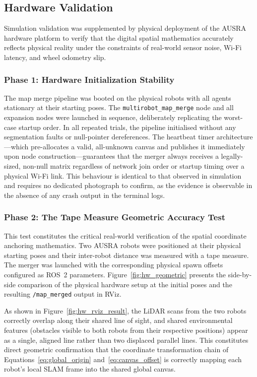 \documentclass{article}
\begin{document}
\subsection{Hardware Validation}
\label{subsec:map_merge_hw_validation}

Simulation validation was supplemented by physical deployment of the AUSRA hardware platform to verify that the digital spatial mathematics accurately reflects physical reality under the constraints of real-world sensor noise, Wi-Fi latency, and wheel odometry slip.

\subsubsection{Phase 1: Hardware Initialization Stability}

The map merge pipeline was booted on the physical robots with all agents stationary at their starting poses. The \texttt{multirobot\_map\_merge} node and all expansion nodes were launched in sequence, deliberately replicating the worst-case startup order. In all repeated trials, the pipeline initialised without any segmentation faults or null-pointer dereferences. The heartbeat timer architecture—which pre-allocates a valid, all-unknown canvas and publishes it immediately upon node construction—guarantees that the merger always receives a legally-sized, non-null matrix regardless of network join order or startup timing over a physical Wi-Fi link. This behaviour is identical to that observed in simulation and requires no dedicated photograph to confirm, as the evidence is observable in the absence of any crash output in the terminal logs.

\subsubsection{Phase 2: The Tape Measure Geometric Accuracy Test}

This test constitutes the critical real-world verification of the spatial coordinate anchoring mathematics. Two AUSRA robots were positioned at their physical starting poses and their inter-robot distance was measured with a tape measure. The merger was launched with the corresponding physical spawn offsets configured as ROS~2 parameters. Figure~\ref{fig:hw_geometric} presents the side-by-side comparison of the physical hardware setup at the initial poses and the resulting \texttt{/map\_merged} output in RViz.

As shown in Figure~\ref{fig:hw_rviz_result}, the LiDAR scans from the two robots correctly overlap along their shared line of sight, and shared environmental features (obstacles visible to both robots from their respective positions) appear as a single, aligned line rather than two displaced parallel lines. This constitutes direct geometric confirmation that the coordinate transformation chain of Equations~\ref{eq:global_origin} and~\ref{eq:canvas_offset} is correctly mapping each robot's local SLAM frame into the shared global canvas.
\end{document}
